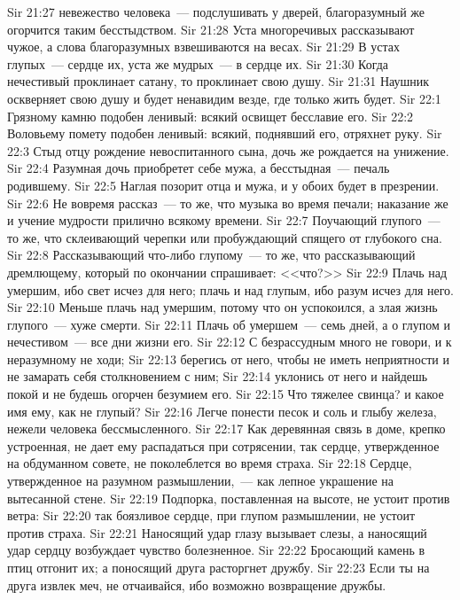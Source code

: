 \vs Sir 21:27 невежество человека~--- подслушивать у дверей, благоразумный же огорчится таким бесстыдством.
\vs Sir 21:28 Уста многоречивых рассказывают чужое, а слова благоразумных взвешиваются на весах.
\vs Sir 21:29 В устах глупых~--- сердце их, уста же мудрых~--- в сердце их.
\vs Sir 21:30 Когда нечестивый проклинает сатану, то проклинает свою душу.
\vs Sir 21:31 Наушник оскверняет свою душу и будет ненавидим везде, где только жить будет.
\vs Sir 22:1 Грязному камню подобен ленивый: всякий освищет бесславие его.
\vs Sir 22:2 Воловьему помету подобен ленивый: всякий, поднявший его, отряхнет руку.
\vs Sir 22:3 Стыд отцу рождение невоспитанного сына, дочь же  рождается на унижение.
\vs Sir 22:4 Разумная дочь приобретет себе мужа, а бесстыдная~--- печаль родившему.
\vs Sir 22:5 Наглая позорит отца и мужа, и у обоих будет в презрении.
\vs Sir 22:6 Не вовремя рассказ~--- то же, что музыка во время печали; наказание же и учение мудрости прилично всякому времени.
\vs Sir 22:7 Поучающий глупого~--- то же, что склеивающий черепки или пробуждающий спящего от глубокого сна.
\vs Sir 22:8 Рассказывающий что-либо глупому~--- то же, что рассказывающий дремлющему, который по окончании спрашивает: <<что?>>
\vs Sir 22:9 Плачь над умершим, ибо свет исчез для него; плачь и над глупым, ибо разум исчез для него.
\vs Sir 22:10 Меньше плачь над умершим, потому что он успокоился, а злая жизнь глупого~--- хуже смерти.
\vs Sir 22:11 Плачь об умершем~--- семь дней, а о глупом и нечестивом~--- все дни жизни его.
\vs Sir 22:12 С безрассудным много не говори, и к неразумному не ходи;
\vs Sir 22:13 берегись от него, чтобы не иметь неприятности и не замарать себя столкновением с ним;
\vs Sir 22:14 уклонись от него и найдешь покой и не будешь огорчен безумием его.
\vs Sir 22:15 Что тяжелее свинца? и какое имя ему, как не глупый?
\vs Sir 22:16 Легче понести песок и соль и глыбу железа, нежели человека бессмысленного.
\vs Sir 22:17 Как деревянная связь в доме, крепко устроенная, не дает ему распадаться при сотрясении, так сердце, утвержденное на обдуманном совете, не поколеблется во время страха.
\vs Sir 22:18 Сердце, утвержденное на разумном размышлении,~--- как лепное украшение на вытесанной стене.
\vs Sir 22:19 Подпорка, поставленная на высоте, не устоит против ветра:
\vs Sir 22:20 так боязливое сердце, при глупом размышлении, не устоит против страха.
\rsbpar\vs Sir 22:21 Наносящий удар глазу вызывает слезы, а наносящий удар сердцу возбуждает чувство болезненное.
\vs Sir 22:22 Бросающий камень в птиц отгонит их; а поносящий друга расторгнет дружбу.
\vs Sir 22:23 Если ты на друга извлек меч, не отчаивайся, ибо возможно возвращение дружбы.
